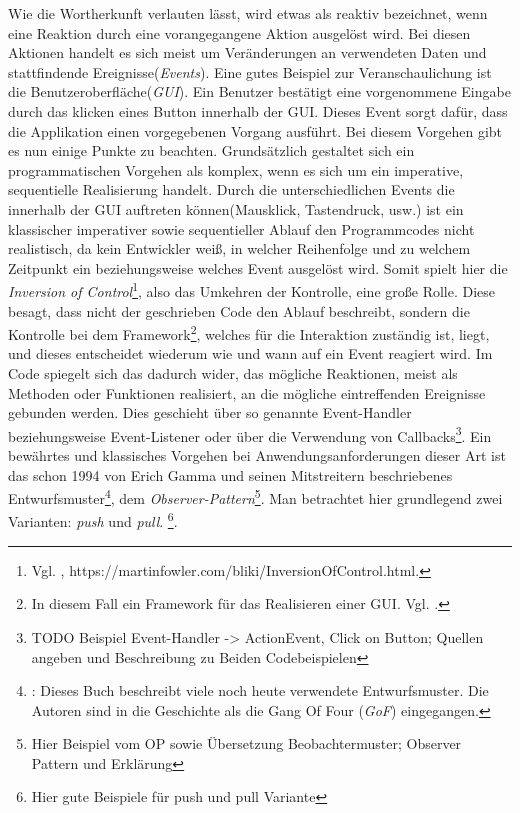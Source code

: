 Wie die Wortherkunft verlauten lässt, wird etwas als reaktiv bezeichnet, wenn eine Reaktion durch eine vorangegangene Aktion ausgelöst wird. Bei diesen Aktionen handelt es sich meist um Veränderungen an verwendeten Daten und stattfindende Ereignisse(\textit{Events}). Eine gutes Beispiel zur Veranschaulichung ist die Benutzeroberfläche(\textit{GUI}). Ein Benutzer bestätigt eine vorgenommene Eingabe durch das klicken eines Button innerhalb der GUI. Dieses Event sorgt dafür, dass die Applikation einen vorgegebenen Vorgang ausführt. Bei diesem Vorgehen gibt es nun einige Punkte zu beachten. Grundsätzlich gestaltet sich ein programmatischen Vorgehen als komplex, wenn es sich um ein imperative, sequentielle Realisierung handelt. Durch die unterschiedlichen Events die innerhalb der GUI auftreten können(Mausklick, Tastendruck, usw.) ist ein klassischer imperativer sowie sequentieller Ablauf den Programmcodes nicht realistisch, da kein Entwickler weiß, in welcher Reihenfolge und zu welchem Zeitpunkt ein beziehungsweise welches Event ausgelöst wird. Somit spielt hier die \textit{Inversion of Control}\footnote{Vgl. \cite{MartinFowler.2005}, https://martinfowler.com/bliki/InversionOfControl.html.}, also das Umkehren der Kontrolle, eine große Rolle. Diese besagt, dass nicht der geschrieben Code den Ablauf beschreibt, sondern die Kontrolle bei dem Framework\footnote{In diesem Fall ein Framework für das Realisieren einer GUI. Vgl. \cite{wiki.guilist}.}, welches für die Interaktion zuständig ist, liegt, und dieses entscheidet wiederum wie und wann auf ein Event reagiert wird. Im Code spiegelt sich das dadurch wider, das mögliche Reaktionen, meist als Methoden oder Funktionen realisiert, an die mögliche eintreffenden Ereignisse gebunden werden. Dies geschieht über so genannte Event-Handler beziehungsweise Event-Listener oder über die Verwendung von Callbacks\footnote{TODO Beispiel Event-Handler -> ActionEvent, Click on Button; Quellen angeben und Beschreibung zu Beiden Codebeispielen}. Ein bewährtes und klassisches Vorgehen bei Anwendungsanforderungen dieser Art ist das schon 1994 von Erich Gamma und seinen Mitstreitern beschriebenes Entwurfsmuster\footnote{\cite{Gamma.2011}: Dieses Buch beschreibt viele noch heute verwendete Entwurfsmuster. Die Autoren sind in die Geschichte als die Gang Of Four (\textit{GoF}) eingegangen.}, dem \textit{Observer-Pattern}\footnote{Hier Beispiel vom OP sowie Übersetzung Beobachtermuster; Observer Pattern und Erklärung}. Man betrachtet hier grundlegend zwei Varianten: \textit{push}  und \textit{pull}. \footnote{Hier gute Beispiele für push und pull Variante}. 
